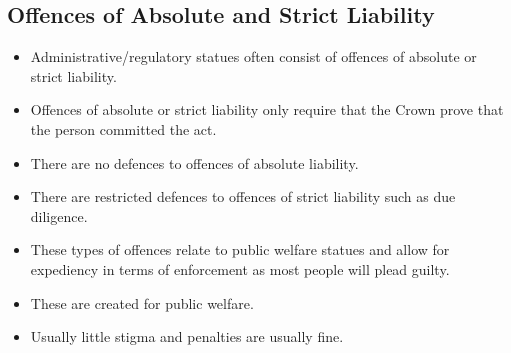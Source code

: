 \documentclass{article}
\begin{document}
\subsection{Offences of Absolute and Strict Liability}
\begin{itemize}
    \item Administrative/regulatory statues often consist of offences of absolute or strict liability.
    \item Offences of absolute or strict liability only require that the Crown prove that the person committed the act.
    \item There are no defences to offences of absolute liability.
    \item There are restricted defences to offences of strict liability such as due diligence.
    \item These types of offences relate to public welfare statues and allow for expediency in terms of enforcement as most people will plead guilty.
    \item These are created for public welfare.
    \item Usually little stigma and penalties are usually fine.
\end{itemize}
\end{document}
